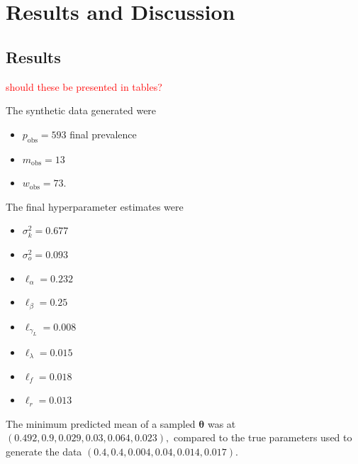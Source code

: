 \chapter{Results and Discussion}

\section{Results}

\textcolor{red}{should these be presented in tables?}

The synthetic data generated were \begin{itemize}
    \item $p_\text{obs} =  593$ final prevalence
    \item $m_\text{obs} = 13$
    \item $w_\text{obs} = 73.$
\end{itemize}

The final hyperparameter estimates were
\begin{itemize}
    \item $\sigma^2_k = 0.677$
    \item $\sigma^2_o = 0.093$
    \item $\ell_\alpha = 0.232$
    \item $\ell_\beta = 0.25$
    \item $\ell_{\gamma_L} = 0.008$
    \item $\ell_\lambda = 0.015$
    \item $\ell_f = 0.018$
    \item $\ell_r = 0.013$
\end{itemize}

The minimum predicted mean of a sampled $\bm{\theta}$ was at
$(0.492, 0.9, 0.029, 0.03, 0.064, 0.023),$ compared to the true parameters
used to generate the data $(0.4, 0.4, 0.004, 0.04, 0.014, 0.017).$

